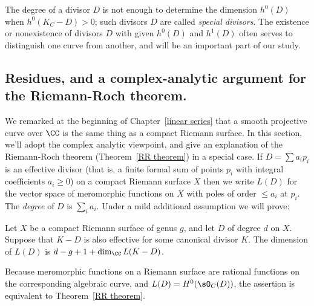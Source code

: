 The degree of a divisor $D$ is not enough to determine the dimension $h^0(D)$ when $h^0(K_C - D)>0$; such 
divisors $D$ are called \emph{special divisors}. The existence or nonexistence of divisors $D$ with given $h^{0}(D)$ and $h^{1}(D)$ often serves to distinguish one curve from another, and will be an important part of our study.

\subsection{Residues, and a complex-analytic argument for the Riemann-Roch theorem.}\label{RR by residues}

We remarked at the beginning of Chapter~\ref{linear series} that a smooth projective curve over $\CC$ is the same thing as a compact Riemann surface. In this section, we'll adopt the complex analytic viewpoint, and give an explanation of the Riemann-Roch theorem  (Theorem~\ref{RR theorem}) in a special case. 
If $D = \sum a_ip_i$ is an effective divisor (that is, a finite formal sum of points $p_i$ with integral coefficients $a_i\geq 0$)
on a compact Riemann surface $X$ then we write $L(D)$ for the vector space of meromorphic functions on $X$ with poles of order $\leq a_i$ at $p_i$. The \emph{degree} of $D$ is $\sum_i a_i$.
Under a mild additional assumption we will prove:

\begin{theorem}
Let $X$ be a compact Riemann surface of genus $g$, and let $D$ of degree $d$ on $X$. Suppose that $K-D$ is also effective for some canonical divisor $K$.
The dimension of  $L(D)$ is
$d-g+1+\dim_\CC L(K-D)$.
\end{theorem}

Because  meromorphic functions on a Riemann surface are rational functions on the corresponding
algebraic curve, and $L(D) = H^0(\sO_C(D))$, the assertion is equivalent to Theorem~\ref{RR theorem}.

